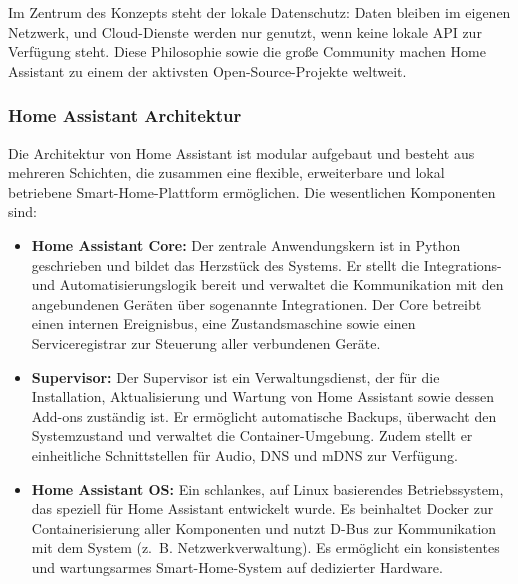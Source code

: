 Im Zentrum des Konzepts steht der lokale Datenschutz: Daten bleiben im eigenen Netzwerk, und Cloud-Dienste werden nur genutzt, wenn keine lokale API zur Verfügung steht. Diese Philosophie sowie die große Community machen Home Assistant zu einem der aktivsten Open-Source-Projekte weltweit.

\subsubsection{Home Assistant Architektur}

Die Architektur von Home Assistant ist modular aufgebaut und besteht aus mehreren Schichten, die zusammen eine flexible, erweiterbare und lokal betriebene Smart-Home-Plattform ermöglichen. Die wesentlichen Komponenten sind:

\begin{itemize}
  \item \textbf{Home Assistant Core:} Der zentrale Anwendungskern ist in Python geschrieben und bildet das Herzstück des Systems. Er stellt die Integrations- und Automatisierungslogik bereit und verwaltet die Kommunikation mit den angebundenen Geräten über sogenannte Integrationen. Der Core betreibt einen internen Ereignisbus, eine Zustandsmaschine sowie einen Serviceregistrar zur Steuerung aller verbundenen Geräte.\\
  
  \item \textbf{Supervisor:} Der Supervisor ist ein Verwaltungsdienst, der für die Installation, Aktualisierung und Wartung von Home Assistant sowie dessen Add-ons zuständig ist. Er ermöglicht automatische Backups, überwacht den Systemzustand und verwaltet die Container-Umgebung. Zudem stellt er einheitliche Schnittstellen für Audio, DNS und mDNS zur Verfügung.\\

  \item \textbf{Home Assistant OS:} Ein schlankes, auf Linux basierendes Betriebssystem, das speziell für Home Assistant entwickelt wurde. Es beinhaltet Docker zur Containerisierung aller Komponenten und nutzt D-Bus zur Kommunikation mit dem System (z.~B. Netzwerkverwaltung). Es ermöglicht ein konsistentes und wartungsarmes Smart-Home-System auf dedizierter Hardware.

\end{itemize}

